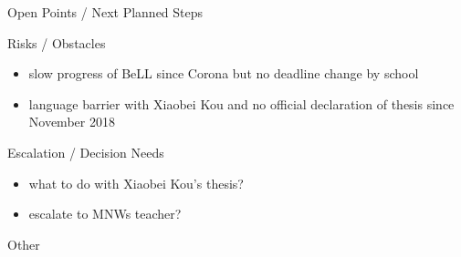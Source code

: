 \documentclass[]{kiesgrube}
\begin{document}
\begin{poster}
\begin{posterbox}[name=open,column=1,below=description]{Open Points / Next Planned Steps}
\end{posterbox}
\begin{posterbox}[name=risks,column=1,below=open]{Risks / Obstacles}
\begin{itemize}
\item slow progress of BeLL since Corona but no deadline change by school
\item language barrier with Xiaobei Kou and no official declaration of thesis since November 2018
\end{itemize}
\end{posterbox}
\begin{posterbox}[name=escalation,column=1,below=risks]{Escalation / Decision Needs}
\begin{itemize}
\item what to do with Xiaobei Kou's thesis?
\item escalate to MNWs teacher?
\end{itemize}
\end{posterbox}
\begin{posterbox}[name=other,column=1,below=escalation]{Other}
\end{posterbox}
\end{poster}
\end{document}
